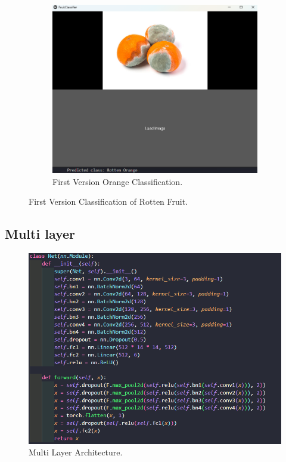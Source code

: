 \documentclass[conference]{IEEEtran}
\begin{document}
\begin{figure}[h]
\begin{subfigure}[b]{0.48\linewidth}
        \label{figFB}
    \end{subfigure}
    \hfill
    \begin{subfigure}[b]{0.48\linewidth}
        \centering
        \includegraphics[width=\linewidth]{1layer orageR3.png}
        \caption{First Version Orange Classification.}
        \label{figFB}
    \end{subfigure}
    \caption{First Version Classification of Rotten Fruit.}
    \label{Fig1R}
\end{figure}
\clearpage

\subsection{Multi layer}

\begin{figure}[h]
    \centering
    \includegraphics[width=\linewidth]{multi architecture.png}
    \caption{Multi Layer Architecture.}
    \label{figMl}
\end{figure}
\end{document}

